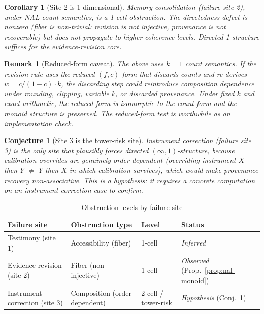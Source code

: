 \documentclass[11pt]{article}
\newtheorem{conjecture}{Conjecture}
\newtheorem{remark}{Remark}
\newtheorem{corollary}{Corollary}
\begin{document}
\begin{corollary}[Site 2 is 1-dimensional]
\label{cor:site2-1d}
Memory consolidation (failure site 2), under NAL count semantics, is a 1-cell obstruction.
The directedness defect is nonzero (fiber is non-trivial: revision is not injective, provenance
is not recoverable) but does not propagate to higher coherence levels. Directed 1-structure
suffices for the evidence-revision core.
\end{corollary}

\begin{remark}[Reduced-form caveat]
\label{rem:reduced-form}
The above uses $k = 1$ count semantics. If the revision rule uses the reduced $(f, c)$ form
that discards counts and re-derives $w = c/(1-c) \cdot k$, the discarding step could
reintroduce composition dependence under rounding, clipping, variable $k$, or discarded
provenance. Under fixed $k$ and exact arithmetic, the reduced form is isomorphic to the count
form and the monoid structure is preserved. The reduced-form test is worthwhile as an
implementation check.
\end{remark}

\begin{conjecture}[Site 3 is the tower-risk site]
\label{conj:site3-tower}
Instrument correction (failure site 3) is the only site that plausibly forces directed
$(\infty,1)$-structure, because calibration overrides are genuinely order-dependent
(overriding instrument $X$ then $Y$ $\neq$ $Y$ then $X$ in which calibration survives),
which would make provenance recovery non-associative. This is a \emph{hypothesis}: it requires
a concrete computation on an instrument-correction case to confirm.
\end{conjecture}

\begin{table}[h]
\centering
\begin{tabular}{|l|l|l|l|}
\hline
\textbf{Failure site} & \textbf{Obstruction type} & \textbf{Level} & \textbf{Status} \\
\hline
Testimony (site 1) & Accessibility (fiber) & 1-cell & \emph{Inferred} \\
Evidence revision (site 2) & Fiber (non-injective) & 1-cell & \emph{Observed} (Prop.~\ref{prop:nal-monoid}) \\
Instrument correction (site 3) & Composition (order-dependent) & 2-cell / tower-risk & \emph{Hypothesis} (Conj.~\ref{conj:site3-tower}) \\
\hline
\end{tabular}
\caption{Obstruction levels by failure site}
\label{tab:obstruction-levels}
\end{table}
\end{document}
